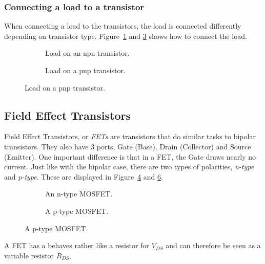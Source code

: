 \subsubsection*{Connecting a load to a transistor}
When connecting a load to the transistors, the load is connected differently
depending on transistor type. Figure~\ref{fig:npnload} and \ref{fig:pnpload}
shows how to connect the load.
\begin{figure}[H]
\centering
\begin{subfigure}{.5\textwidth}
    \centering
    
    \caption{Load on an npn transistor.}
    \label{fig:npnload}
\end{subfigure}%
\begin{subfigure}{.5\textwidth}
    \centering
    
    \caption{Load on a pnp transistor.}
    \label{fig:pnpload}
\end{subfigure}
\end{figure}

\subsection*{Field Effect Transistors}
Field Effect Transistors, or \textit{FETs} are transistors that do similar tasks
to bipolar transistors. They also have 3 ports, Gate (Base), Drain (Collector)
and Source (Emitter).  One important difference is that in a FET, the Gate draws
nearly no current. Just like with the bipolar case, there are two types of
polarities, \textit{n-type} and \textit{p-type}. These are displayed in
Figure~\ref{fig:nMOS} and \ref{fig:pMOS}.
\begin{figure}[H]
\centering
\begin{subfigure}{.5\textwidth}
    \centering
    
    \caption{An n-type MOSFET.}
    \label{fig:nMOS}
\end{subfigure}%
\begin{subfigure}{.5\textwidth}
    \centering
    
    \caption{A p-type MOSFET.}
    \label{fig:pMOS}
\end{subfigure}
\end{figure}
A FET has a behaves rather like a resistor for $V_{DS}$ and can therefore be
seen as a variable resistor $R_{DS}$.
